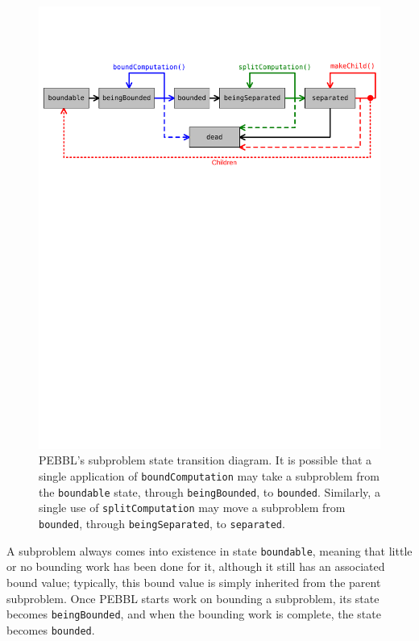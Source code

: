 \begin{figure}[tbp]
\begin{center}
\includegraphics[width=\textwidth]{states-horizontal}
\vspace{-0.5in}
\end{center}
\caption{PEBBL's subproblem state transition diagram.  It is possible
that a single application of \texttt{boundComputation} may take a
subproblem from the \texttt{boundable} state, through
\texttt{beingBounded}, to \texttt{bounded}.  Similarly, a single use
of \texttt{splitComputation} may move a subproblem from
\texttt{bounded}, through \texttt{beingSeparated}, to
\texttt{separated}.}
\label{fig:states}
\end{figure}

A subproblem always comes into existence in state \texttt{boundable},
meaning that little or no bounding work has been done for it, although
it still has an associated bound value; typically, this bound value is
simply inherited from the parent subproblem.  Once PEBBL starts work on
bounding a subproblem, its state becomes \texttt{beingBounded}, and
when the bounding work is complete, the state becomes
\texttt{bounded}.

